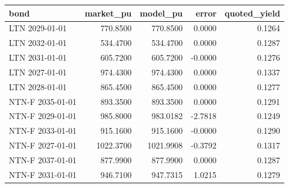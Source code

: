 \begin{tabular}{lrrrr}
\toprule
bond & market_pu & model_pu & error & quoted_yield \\
\midrule
LTN 2029-01-01 & 770.8500 & 770.8500 & 0.0000 & 0.1264 \\
LTN 2032-01-01 & 534.4700 & 534.4700 & 0.0000 & 0.1287 \\
LTN 2031-01-01 & 605.7200 & 605.7200 & -0.0000 & 0.1276 \\
LTN 2027-01-01 & 974.4300 & 974.4300 & 0.0000 & 0.1337 \\
LTN 2028-01-01 & 865.4500 & 865.4500 & 0.0000 & 0.1277 \\
NTN-F 2035-01-01 & 893.3500 & 893.3500 & 0.0000 & 0.1291 \\
NTN-F 2029-01-01 & 985.8000 & 983.0182 & -2.7818 & 0.1249 \\
NTN-F 2033-01-01 & 915.1600 & 915.1600 & -0.0000 & 0.1290 \\
NTN-F 2027-01-01 & 1022.3700 & 1021.9908 & -0.3792 & 0.1317 \\
NTN-F 2037-01-01 & 877.9900 & 877.9900 & 0.0000 & 0.1287 \\
NTN-F 2031-01-01 & 946.7100 & 947.7315 & 1.0215 & 0.1279 \\
\bottomrule
\end{tabular}
